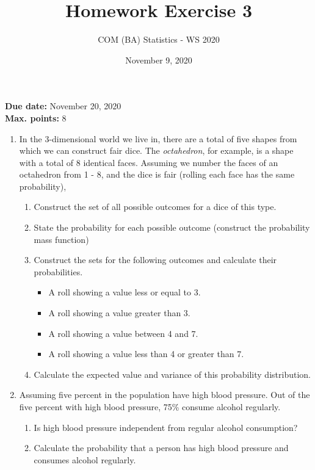 \documentclass[a4paper, fleqn]{article}
\title{Homework Exercise 3}
\author{COM (BA) Statistics - WS 2020}
\date{November 9, 2020}
\begin{document}
\maketitle
\thispagestyle{empty}

\noindent
\textbf{Due date:} November 20, 2020 \\
\textbf{Max. points:} 8 \\

\begin{enumerate}
  \item In the 3-dimensional world we live in, there are a total of five shapes from which we can construct fair dice. 
    The \textit{octahedron}, for example, is a shape with a total of 8 identical faces. Assuming we number the faces of an octahedron from 1 - 8, and the dice is fair (rolling each face has the same probability),
  \begin{enumerate}
    \item Construct the set of all possible outcomes for a dice of this type.
    \item State the probability for each possible outcome (construct the probability mass function)
    \item Construct the sets for the following outcomes and calculate their probabilities.
      \begin{itemize}
        \item A roll showing a value less or equal to 3.
        \item A roll showing a value greater than 3.
        \item A roll showing a value between 4 and 7.
        \item A roll showing a value less than 4 or greater than 7.
      \end{itemize}
    \item Calculate the expected value and variance of this probability distribution. 
  \end{enumerate}

  \vspace{1em}
\item Assuming five percent in the population have high blood pressure. Out of the five percent with high blood pressure, 75\% consume alcohol regularly. 
  \begin{enumerate}
    \item Is high blood pressure independent from regular alcohol consumption?
    \item Calculate the probability that a person has high blood pressure and consumes alcohol regularly. 
  \end{enumerate}


\end{enumerate}
\end{document}
